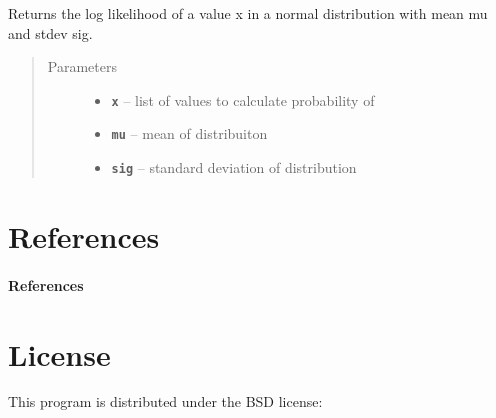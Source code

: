 \documentclass[letterpaper,10pt,english]{sphinxmanual}
\begin{document}
\begin{fulllineitems}
\label{modules:util.normal_loglike}
Returns the log likelihood of a value x in a normal distribution with
mean mu and stdev sig.
\begin{quote}\begin{description}
\item[{Parameters}] \leavevmode\begin{itemize}
\item {} 
\textbf{\texttt{x}} -- list of values to calculate probability of

\item {} 
\textbf{\texttt{mu}} -- mean of distribuiton

\item {} 
\textbf{\texttt{sig}} -- standard deviation of distribution

\end{itemize}

\end{description}\end{quote}

\end{fulllineitems}



\section{References}
\label{references:references}\label{references::doc}\paragraph{References}


\section{License}
\label{license::doc}\label{license:license}
This program is distributed under the BSD license:
\end{document}
